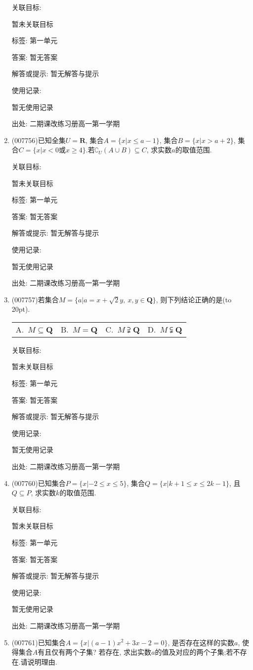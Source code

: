 \documentclass[10pt,a4paper]{article}
\newcommand{\bracket}[1]{(\hbox to #1pt{})}
\newcommand{\fourch}[4]{\par\begin{tabular}{p{.23\textwidth}p{.23\textwidth}p{.23\textwidth}p{.23\textwidth}}
A.~#1 &B.~#2& C.~#3& D.~#4
\end{tabular}}
\begin{document}
\begin{enumerate}[1.]
关联目标:

暂未关联目标



标签: 第一单元

答案: 暂无答案

解答或提示: 暂无解答与提示

使用记录:

暂无使用记录


出处: 二期课改练习册高一第一学期
\item { (007756)}已知全集$U=\mathbf{R}$, 集合$A=\{x|x\le a-1\}$, 集合$B=\{x|x>a+2\}$, 集合$C=\{x|x<0$或$x\ge 4\}$.若$\complement _U(A\cup B)\subseteq C$, 求实数$a$的取值范围.


关联目标:

暂未关联目标



标签: 第一单元

答案: 暂无答案

解答或提示: 暂无解答与提示

使用记录:

暂无使用记录


出处: 二期课改练习册高一第一学期
\item { (007757)}若集合$M=\{a|a=x+\sqrt 2y,\ x,y\in \mathbf{Q}\}$, 则下列结论正确的是\bracket{20}.
\fourch{$M\subseteq \mathbf{Q}$}{$M=\mathbf{Q}$}{$M\supsetneqq \mathbf{Q}$}{$M\subsetneqq \mathbf{Q}$}


关联目标:

暂未关联目标



标签: 第一单元

答案: 暂无答案

解答或提示: 暂无解答与提示

使用记录:

暂无使用记录


出处: 二期课改练习册高一第一学期
\item { (007760)}已知集合$P=\{x|-2\le x\le 5\}$, 集合$Q=\{x|k+1\le x\le 2k-1\}$, 且$Q\subseteq P$, 求实数$k$的取值范围.


关联目标:

暂未关联目标



标签: 第一单元

答案: 暂无答案

解答或提示: 暂无解答与提示

使用记录:

暂无使用记录


出处: 二期课改练习册高一第一学期
\item { (007761)}已知集合$A=\{x|(a-1)x^2+3x-2=0\}$, 是否存在这样的实数$a$, 使得集合$A$有且仅有两个子集? 若存在, 求出实数$a$的值及对应的两个子集;若不存在.请说明理由.



\end{enumerate}
\end{document}
